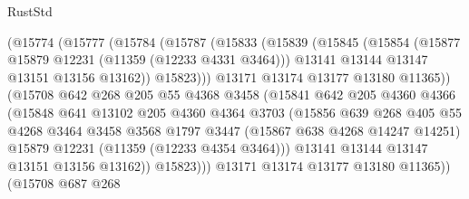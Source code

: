 \begin{lexlean}{RustStd}
\begin{coremodule}
{{{{{{{{{{{{{{{{{{{                      (@15774
                        (@15777
                          (@15784
                            (@15787
                              (@15833
                                (@15839
                                  (@15845
                                    (@15854
                                      (@15877 @15879 @12231 (@11359 (@12233 @4331 @3464)))
                                      @13141
                                      @13144
                                      @13147
                                      @13151
                                      @13156
                                      @13162))
                                  @15823)))
                            @13171
                            @13174
                            @13177
                            @13180
                            @11365))
                        (@15708
                          @642
                          @268
                          @205
                          @55
                          @4368
                          @3458
                          (@15841
                            @642
                            @205
                            @4360
                            @4366
                            (@15848
                              @641
                              @13102
                              @205
                              @4360
                              @4364
                              @3703
                              (@15856
                                @639
                                @268
                                @405
                                @55
                                @4268
                                @3464
                                @3458
                                @3568
                                @1797
                                @3447
                                (@15867 @638 @4268 @14247 @14251)
                                @15879
                                @12231
                                (@11359 (@12233 @4354 @3464)))
                              @13141
                              @13144
                              @13147
                              @13151
                              @13156
                              @13162))
                          @15823)))
                    @13171
                    @13174
                    @13177
                    @13180
                    @11365))
                (@15708
                  @687
                  @268
}}}}}}}}}}}}}}}}}}}
\end{coremodule}
\end{lexlean}

